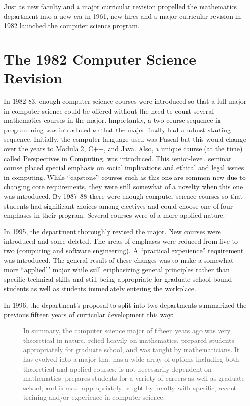 \documentclass[
]{book}
\begin{document}
Just as new faculty and a major curricular revision propelled the mathematics department into a new era in 1961, new hires and a major curricular revision in 1982 launched the computer science program.

\hypertarget{the-1982-computer-science-revision}{%
\section{The 1982 Computer Science Revision}\label{the-1982-computer-science-revision}}

In 1982-83, enough computer science courses were introduced so that a full major in computer science could be offered without the need to count several mathematics courses in the major. Importantly, a two-course sequence in programming was introduced so that the major finally had a robust starting sequence. Initially, the computer language used was Pascal but this would change over the years to Modula 2, C++, and Java. Also, a unique course (at the time) called Perspectives in Computing, was introduced. This senior-level, seminar course placed special emphasis on social implications and ethical and legal issues in computing. While ``capstone'' courses such as this one are common now due to changing core requirements, they were still somewhat of a novelty when this one was introduced. By 1987--88 there were enough computer science courses so that students had significant choices among electives and could choose one of four emphases in their program. Several courses were of a more applied nature.

In 1995, the department thoroughly revised the major. New courses were introduced and some deleted. The areas of emphases were reduced from five to two (computing and software engineering). A ``practical experience'' requirement was introduced. The general result of these changes was to make a somewhat more ``applied'\,' major while still emphasizing general principles rather than specific technical skills and still being appropriate for graduate-school bound students as well as students immediately entering the
workplace.

In 1996, the department's proposal to split into two departments summarized the previous fifteen years of curricular development this way:

\begin{quote}
In summary, the computer science major of fifteen years ago was very theoretical in nature, relied heavily on mathematics, prepared students appropriately for graduate school, and was taught by mathematicians. It has evolved into a major that has a wide array of options including both theoretical and applied courses, is not necessarily dependent on mathematics, prepares students for a variety of careers as well as graduate school, and is most appropriately taught by faculty with specific, recent training and/or experience in computer science.
\end{quote}
\end{document}
